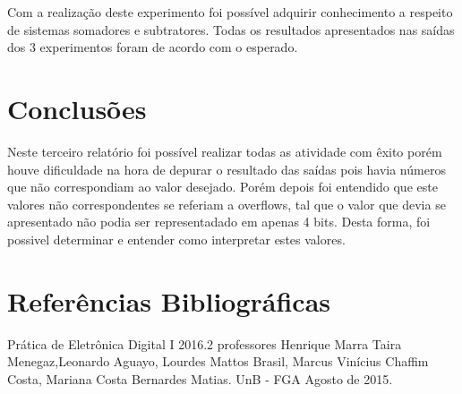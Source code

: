 \documentclass[12pts]{article}
\begin{document}
	Com a realização deste experimento foi possível adquirir conhecimento a respeito de sistemas somadores e subtratores. Todas os resultados apresentados nas saídas dos 3 experimentos foram de acordo com o esperado.

\section{Conclusões}

	Neste terceiro relatório foi possível realizar todas as atividade com êxito porém houve dificuldade na hora de depurar o resultado das saídas pois havia números que não correspondiam ao valor desejado. Porém depois foi entendido que este valores não correspondentes se referiam a overflows, tal que o valor que devia se apresentado não podia ser representadado em apenas 4 bits. Desta forma, foi possivel determinar e entender como interpretar estes valores.

\section{Referências Bibliográficas}

Prática de Eletrônica Digital I 2016.2 professores Henrique Marra Taira Menegaz,Leonardo Aguayo, Lourdes Mattos Brasil, Marcus Vinícius Chaffim Costa, Mariana Costa Bernardes Matias. UnB - FGA Agosto de 2015.

\newpage
\end{document}
